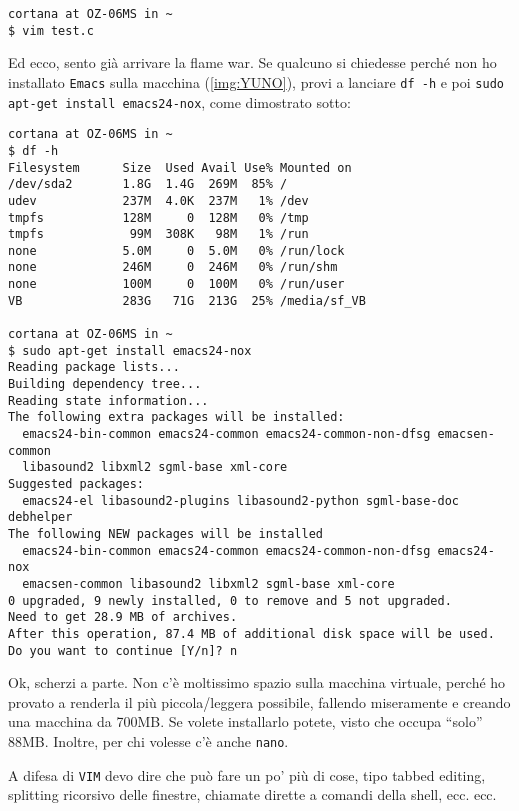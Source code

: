 \documentclass[a4paper]{memoir}
\begin{document}
        \begin{Verbatim}[label={LOL, VIM}]
cortana at OZ-06MS in ~
$ vim test.c
		\end{Verbatim}
		
		Ed ecco, sento già arrivare la flame war. Se qualcuno si chiedesse perché non ho installato \texttt{Emacs}
		sulla macchina (\ref{img:YUNO}), provi a lanciare \texttt{df -h} e poi \texttt{sudo apt-get install emacs24-nox},
		come dimostrato sotto:
		
		\begin{Verbatim}[label={Ecco, vedi che Michele è il solito estremista di VIM?}]
cortana at OZ-06MS in ~
$ df -h
Filesystem      Size  Used Avail Use% Mounted on
/dev/sda2       1.8G  1.4G  269M  85% /
udev            237M  4.0K  237M   1% /dev
tmpfs           128M     0  128M   0% /tmp
tmpfs            99M  308K   98M   1% /run
none            5.0M     0  5.0M   0% /run/lock
none            246M     0  246M   0% /run/shm
none            100M     0  100M   0% /run/user
VB              283G   71G  213G  25% /media/sf_VB

cortana at OZ-06MS in ~
$ sudo apt-get install emacs24-nox
Reading package lists...
Building dependency tree...
Reading state information...
The following extra packages will be installed:
  emacs24-bin-common emacs24-common emacs24-common-non-dfsg emacsen-common
  libasound2 libxml2 sgml-base xml-core
Suggested packages:
  emacs24-el libasound2-plugins libasound2-python sgml-base-doc debhelper
The following NEW packages will be installed
  emacs24-bin-common emacs24-common emacs24-common-non-dfsg emacs24-nox
  emacsen-common libasound2 libxml2 sgml-base xml-core
0 upgraded, 9 newly installed, 0 to remove and 5 not upgraded.
Need to get 28.9 MB of archives.
After this operation, 87.4 MB of additional disk space will be used.
Do you want to continue [Y/n]? n
		\end{Verbatim}
		
        
        Ok, scherzi a parte. Non c'è moltissimo spazio sulla macchina virtuale, perché ho provato a renderla
        il più piccola/leggera possibile, fallendo miseramente e creando una macchina da 700MB. Se volete
        installarlo potete, visto che occupa ``solo'' 88MB. Inoltre, per chi volesse c'è anche \texttt{nano}.
        
        A difesa di \texttt{VIM} devo dire che può fare un po' più di cose, tipo tabbed editing, splitting
        ricorsivo delle finestre, chiamate dirette a comandi della shell, ecc. ecc.
        
\end{document}
